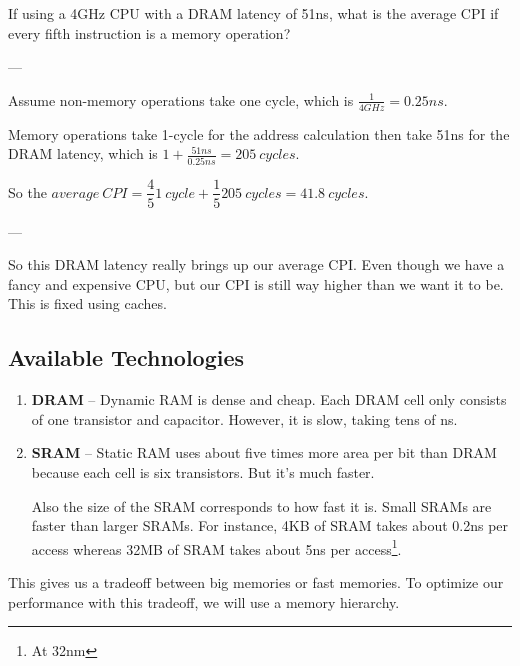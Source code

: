 \documentclass{article}
\begin{document}
If using a 4GHz CPU with a DRAM latency of 51ns, what is the average CPI if every fifth instruction is a memory operation?

---

Assume non-memory operations take one cycle, which is $\frac{1}{4GHz} = 0.25ns$.

Memory operations take 1-cycle for the address calculation then take 51ns for the DRAM latency, which is $1 + \frac{51ns}{0.25ns} = 205\ cycles$. 

So the $average\ CPI = \dfrac{4}{5}1\ cycle + \dfrac{1}{5}205\ cycles = 41.8\ cycles$.

---

So this DRAM latency really brings up our average CPI. Even though we have a fancy and expensive CPU, but our CPI is still way higher than we want it to be. This is fixed using caches.

\subsection{Available Technologies}

\begin{enumerate}
\item \textbf{DRAM} -- Dynamic RAM is dense and cheap. Each DRAM cell only consists of one transistor and capacitor. However, it is slow, taking tens of ns.

\item \textbf{SRAM} -- Static RAM uses about five times more area per bit than DRAM because each cell is six transistors. But it's much faster.

Also the size of the SRAM corresponds to how fast it is. Small SRAMs are faster than larger SRAMs. For instance, 4KB of SRAM takes about 0.2ns per access whereas 32MB of SRAM takes about 5ns per access\footnote{At 32nm}.

\end{enumerate}

This gives us a tradeoff between big memories or fast memories. To optimize our performance with this tradeoff, we will use a memory hierarchy. 
\end{document}
